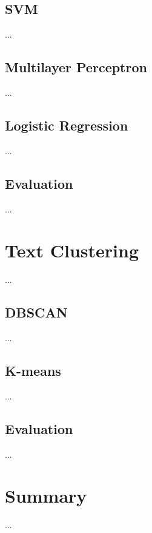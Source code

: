 \documentclass[fleqn,10pt]{SelfArx} %
\begin{document}
\subsection{SVM}
...

\subsection{Multilayer Perceptron}
...

\subsection{Logistic Regression}
...

\subsection{Evaluation}
...

\section{Text Clustering}
...

\subsection{DBSCAN}
...

\subsection{K-means}
...

\subsection{Evaluation}
...

\section{Summary}
...


\nocite{*}
\printbibliography
\end{document}

